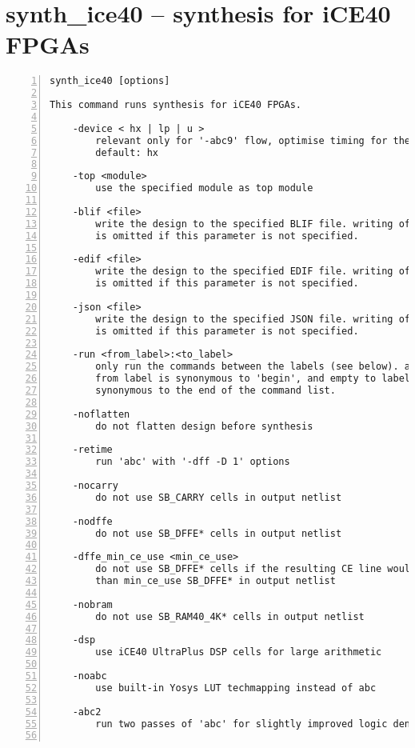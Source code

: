 \section{synth\_ice40 -- synthesis for iCE40 FPGAs}
\label{cmd:synth_ice40}
\begin{lstlisting}[numbers=left,frame=single]
    synth_ice40 [options]

This command runs synthesis for iCE40 FPGAs.

    -device < hx | lp | u >
        relevant only for '-abc9' flow, optimise timing for the specified device.
        default: hx

    -top <module>
        use the specified module as top module

    -blif <file>
        write the design to the specified BLIF file. writing of an output file
        is omitted if this parameter is not specified.

    -edif <file>
        write the design to the specified EDIF file. writing of an output file
        is omitted if this parameter is not specified.

    -json <file>
        write the design to the specified JSON file. writing of an output file
        is omitted if this parameter is not specified.

    -run <from_label>:<to_label>
        only run the commands between the labels (see below). an empty
        from label is synonymous to 'begin', and empty to label is
        synonymous to the end of the command list.

    -noflatten
        do not flatten design before synthesis

    -retime
        run 'abc' with '-dff -D 1' options

    -nocarry
        do not use SB_CARRY cells in output netlist

    -nodffe
        do not use SB_DFFE* cells in output netlist

    -dffe_min_ce_use <min_ce_use>
        do not use SB_DFFE* cells if the resulting CE line would go to less
        than min_ce_use SB_DFFE* in output netlist

    -nobram
        do not use SB_RAM40_4K* cells in output netlist

    -dsp
        use iCE40 UltraPlus DSP cells for large arithmetic

    -noabc
        use built-in Yosys LUT techmapping instead of abc

    -abc2
        run two passes of 'abc' for slightly improved logic density


\end{lstlisting}
